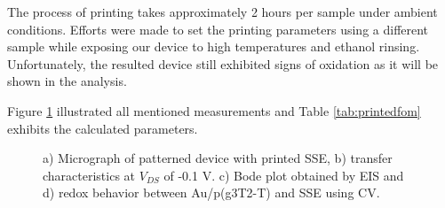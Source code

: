 The process of printing takes approximately 2 hours per sample under ambient conditions. Efforts were made to set the printing parameters using a different sample while exposing our device to high temperatures and ethanol rinsing. Unfortunately, the resulted device still exhibited signs of oxidation as it will be shown in the analysis.

Figure \ref{fig:printedSSE} illustrated all mentioned measurements and Table \ref{tab:printedfom} exhibits the calculated parameters.

\begin{figure}[ht]
    \centering
    \qquad
    \caption[Performance of solid-OECT with printed SSE]{a) Micrograph of patterned device with printed SSE, b) transfer characteristics at $V_{DS}$ of -0.1 V. c) Bode plot obtained by EIS and d) redox behavior between Au/p(g3T2-T) and SSE using CV.}
    \label{fig:printedSSE}
\end{figure}

